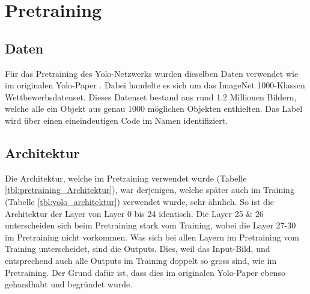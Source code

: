\newpage
\section{Pretraining}
\label{chapter:Pretraining}

\subsection{Daten}
Für das Pretraining des Yolo-Netzwerks wurden dieselben Daten verwendet wie im originalen Yolo-Paper \cite{yolo}.
Dabei handelte es sich um das ImageNet 1000-Klassen Wettbewerbsdatenset.
Dieses Datenset bestand aus rund 1.2 Millionen Bildern, welche alle ein Objekt aus genau 1000 möglichen Objekten enthielten.
Das Label wird über einen eineindeutigen Code im Namen identifiziert.
\subsection{Architektur}
Die Architektur, welche im Pretraining verwendet wurde (Tabelle \ref{tbl:pretraining_Architektur}), war derjenigen, welche später auch im Training (Tabelle \ref{tbl:yolo_architektur}) verwendet wurde, sehr ähnlich.
So ist die Architektur der Layer von Layer 0 bis 24 identisch. 
Die Layer 25 \& 26 unterscheiden sich beim Pretraining stark vom Training, wobei die Layer 27-30 im Pretraining nicht vorkommen.
Was sich bei allen Layern im Pretraining vom Training unterscheidet, sind die Outputs. 
Dies, weil das Input-Bild, und entsprechend auch alle Outputs im Training doppelt so gross sind, wie im Pretraining. 
Der Grund dafür ist, dass dies im originalen Yolo-Paper \cite{yolo} ebenso gehandhabt und begründet wurde.

